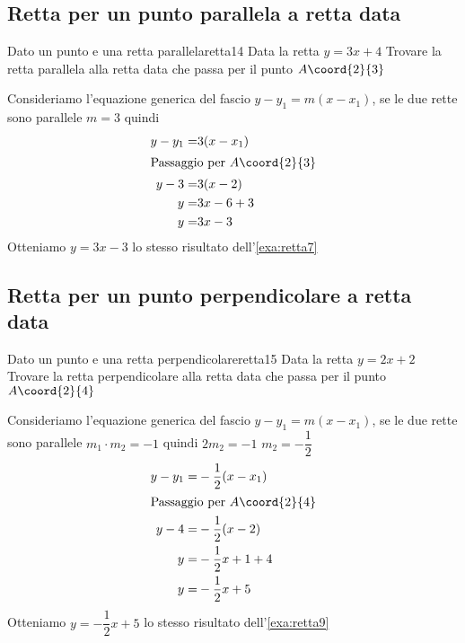 \subsection{Retta per un punto parallela a retta data}
\begin{esempiot}{Dato un punto e una retta parallela}{retta14}
	Data la retta $y=3x+4$ Trovare la retta parallela alla retta data che  passa per il punto	$A\coord{2}{3}$
\end{esempiot}
Consideriamo l'equazione generica del fascio $y-y_1=m(x-x_1)$, se le due rette sono parallele $m=3$ quindi
\begin{align*}
	y-y_1=&3(x-x_1)\\
	\intertext{Passaggio per $A\coord{2}{3}$}
	y-3=&3(x-2)\\
	y=&3x-6+3\\
	y=&3x-3\\
\end{align*}
Otteniamo 	$y=3x-3$ lo stesso risultato dell'\cref{exa:retta7}
\subsection{Retta per un punto perpendicolare a retta data}
\begin{esempiot}{Dato un punto e una retta perpendicolare}{retta15}
	Data la retta $y=2x+2$ Trovare la retta perpendicolare alla retta data che  passa per il punto	$A\coord{2}{4}$
\end{esempiot}
Consideriamo l'equazione generica del fascio $y-y_1=m(x-x_1)$, se le due rette sono parallele $m_1\cdot m_2=-1$ quindi $2m_2=-1$ $m_2=-\dfrac{1}{2}$
\begin{align*}
	y-y_1=&-\dfrac{1}{2}(x-x_1)\\
	\intertext{Passaggio per $A\coord{2}{4}$}
	y-4=&-\dfrac{1}{2}(x-2)\\
	y=&-\dfrac{1}{2}x+1+4\\
	y=&-\dfrac{1}{2}x+5\\
\end{align*}
Otteniamo 	$y=-\dfrac{1}{2}x+5$ lo stesso risultato dell'\cref{exa:retta9}
